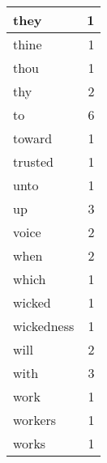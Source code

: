 \begin{center}
\begin{longtable}{l|r}
they & 1 \\ \hline
thine & 1 \\ \hline
thou & 1 \\ \hline
thy & 2 \\ \hline
to & 6 \\ \hline
toward & 1 \\ \hline
trusted & 1 \\ \hline
unto & 1 \\ \hline
up & 3 \\ \hline
voice & 2 \\ \hline
when & 2 \\ \hline
which & 1 \\ \hline
wicked & 1 \\ \hline
wickedness & 1 \\ \hline
will & 2 \\ \hline
with & 3 \\ \hline
work & 1 \\ \hline
workers & 1 \\ \hline
works & 1 \\ \hline
\end{longtable}
\end{center}



\normalsize



